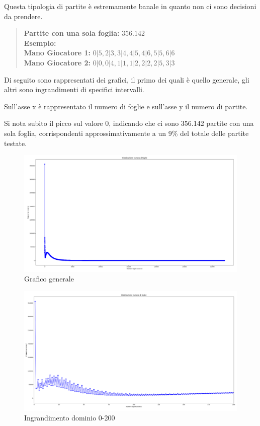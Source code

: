 \documentclass[a4paper,12pt]{report}
\begin{document}
Questa tipologia di partite è estremamente banale in quanto non ci sono decisioni da prendere.

\begin{quote}
    \textbf{Partite con una sola foglia:} \(356.142\)\\
    \textbf{Esempio:} \(\)\\
    \textbf{Mano Giocatore 1:} \(0|5, 2|3, 3|4, 4|5, 4|6, 5|5, 6|6\)\\
    \textbf{Mano Giocatore 2:} \(0|0, 0|4, 1|1, 1|2, 2|2, 2|5, 3|3\)
\end{quote}

Di seguito sono rappresentati dei grafici, il primo dei quali è quello generale, gli altri sono ingrandimenti di specifici intervalli.

Sull'asse x è rappresentato il numero di foglie e sull'asse y il numero di partite.

Si nota subito il picco sul valore 0, indicando che ci sono 356.142 partite con una sola foglia, corrispondenti approssimativamente a un 9\% del totale delle partite testate.

\begin{figure}[h!]
    \centering
    \includegraphics[width=1\textwidth]{imgs/grafico_base.png} 
    \caption{Grafico generale}
    \label{fig:etichetta}
\end{figure}

\begin{figure}[h!]
    \centering
    \includegraphics[width=1\textwidth]{imgs/grafico_0_200.png} 
    \caption{Ingrandimento dominio 0-200}
    \label{fig:etichetta}
\end{figure}
\end{document}
